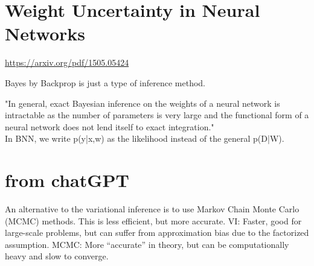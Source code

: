 \section{Weight Uncertainty in Neural Networks}
\url{https://arxiv.org/pdf/1505.05424}

Bayes by Backprop is just a type of inference method.

"In general, exact Bayesian inference on the weights of a neural network is intractable as the number of parameters is very large and the functional form of a neural network does not lend itself to exact integration."
\\
In BNN, we write p(y|x,w) as the likelihood instead of the general p(D|W). 


\section{from chatGPT}

An alternative to the variational inference is to use Markov Chain Monte Carlo (MCMC) methods. This is less efficient, but more accurate. 
VI: Faster, good for large-scale problems, but can suffer from approximation bias due to the factorized assumption.
MCMC: More “accurate” in theory, but can be computationally heavy and slow to converge.